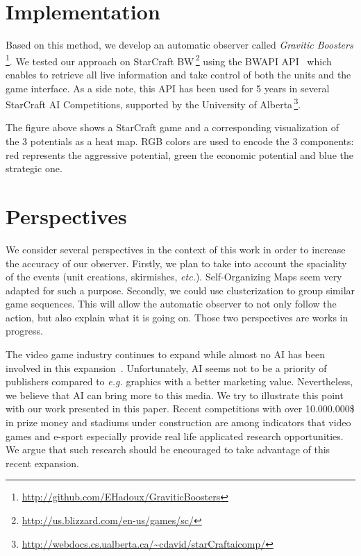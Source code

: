 \documentclass{jfsma}
\begin{document}
\section{Implementation}

Based on this method, we develop an automatic observer called \emph{Gravitic Boosters}\,\footnote{\url{http://github.com/EHadoux/GraviticBoosters}}.
We tested our approach on StarCraft BW\,\footnote{\url{http://us.blizzard.com/en-us/games/sc/}} using
the BWAPI API~\cite{bwapi} which enables to retrieve all live information and take control of both the units and the game interface.
As a side note, this API has been used for 5 years in several StarCraft AI Competitions, supported by the University of Alberta\,\footnote{\url{http://webdocs.cs.ualberta.ca/~cdavid/starCraftaicomp/}}.

The figure above shows a StarCraft game and a corresponding visualization of the 3 potentials as a heat map.
RGB colors are used to encode the 3 components: red represents the aggressive potential, green the economic potential and blue the strategic one.

\section{Perspectives}
We consider several perspectives in the context of this work in order to increase the accuracy of our observer.
Firstly, we plan to take into account the spaciality of the events (unit creations, skirmishes, \emph{etc.}).
Self-Organizing Maps seem very adapted for such a purpose.
Secondly, we could use clusterization to group similar game sequences.
This will allow the automatic observer to not only follow the action, but also explain what it is going on.
Those two perspectives are works in progress.

The video game industry continues to expand while almost no AI has been involved in this expansion~\cite{miikkulainen2007creating}.
Unfortunately, AI seems not to be a priority of publishers compared to \textit{e.g.} graphics with a better marketing value.
Nevertheless, we believe that AI can bring more to this media.
We try to illustrate this point with our work presented in this paper.
Recent competitions with over 10.000.000\$ in prize money and stadiums under construction are among indicators that video games and e-sport especially provide real life applicated research opportunities.
We argue that such research should be encouraged to take advantage of this recent expansion.



\end{document}
